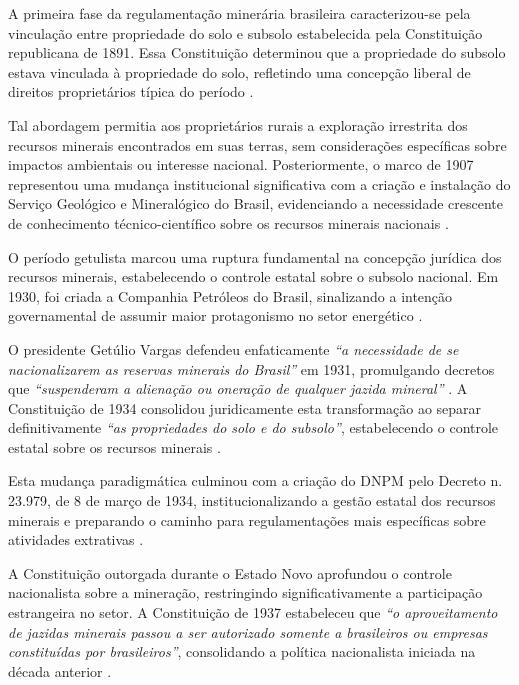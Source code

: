 A primeira fase da regulamentação minerária brasileira caracterizou-se pela vinculação entre propriedade do solo e subsolo estabelecida pela Constituição republicana de 1891. Essa Constituição determinou que a propriedade do subsolo estava vinculada à propriedade do solo, refletindo uma concepção liberal de direitos proprietários típica do período \cite{mme2025linha}.

Tal abordagem permitia aos proprietários rurais a exploração irrestrita dos recursos minerais encontrados em suas terras, sem considerações específicas sobre impactos ambientais ou interesse nacional. Posteriormente, o marco de 1907 representou uma mudança institucional significativa com a criação e instalação do Serviço Geológico e Mineralógico do Brasil, evidenciando a necessidade crescente de conhecimento técnico-científico sobre os recursos minerais nacionais \cite{mme2025linha}.

O período getulista marcou uma ruptura fundamental na concepção jurídica dos recursos minerais, estabelecendo o controle estatal sobre o subsolo nacional. Em 1930, foi criada a Companhia Petróleos do Brasil, sinalizando a intenção governamental de assumir maior protagonismo no setor energético \cite{mme2025linha}. 

O presidente Getúlio Vargas defendeu enfaticamente \textit{``a necessidade de se nacionalizarem as reservas minerais do Brasil''} em 1931, promulgando decretos que \textit{``suspenderam a alienação ou oneração de qualquer jazida mineral''} \cite{mme2025linha}. A Constituição de 1934 consolidou juridicamente esta transformação ao separar definitivamente \textit{``as propriedades do solo e do subsolo''}, estabelecendo o controle estatal sobre os recursos minerais \cite{mme2025linha}.

Esta mudança paradigmática culminou com a criação do DNPM pelo Decreto n. 23.979, de 8 de março de 1934, institucionalizando a gestão estatal dos recursos minerais e preparando o caminho para regulamentações mais específicas sobre atividades extrativas \cite{mme2025linha}.

A Constituição outorgada durante o Estado Novo aprofundou o controle nacionalista sobre a mineração, restringindo significativamente a participação estrangeira no setor. A Constituição de 1937 estabeleceu que \textit{``o aproveitamento de jazidas minerais passou a ser autorizado somente a brasileiros ou empresas constituídas por brasileiros''}, consolidando a política nacionalista iniciada na década anterior \cite{mme2025linha}.

